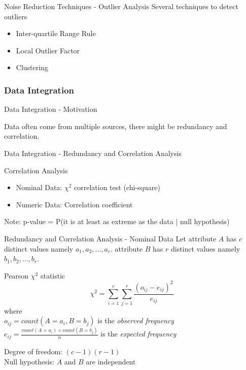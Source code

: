 \begin{frame}{Noise Reduction Techniques - Outlier Analysis}
    Several techniques to detect outliers
    \begin{itemize}
        \item Inter-quartile Range Rule
        \item Local Outlier Factor
        \item Clustering
    \end{itemize}
\end{frame}


\subsubsection{Data Integration}
\begin{frame}{Data Integration - Motivation}

Data often come from multiple sources, there might be redundancy and correlation.

\end{frame}

\begin{frame}{Data Integration - Redundancy and Correlation Analysis}

Correlation Analysis

\begin{itemize}
    \item Nominal Data: $\chi^2$ correlation test (chi-square)
    \item Numeric Data: Correlation coefficient
\end{itemize}

Note: p-value = P(it is at least as extreme as the data | null hypothesis)

\end{frame}

\begin{frame}{Redundancy and Correlation Analysis - Nominal Data}
Let attribute $A$ has $c$ distinct values namely $a_1, a_2, ..., a_c$. attribute $B$ has $r$ distinct values namely $b_1, b_2, ..., b_r$.
\begin{exampleblock}{Pearson $\chi^2$ statistic}
    \begin{equation}
        \chi^2 = \sum_{i=1}^c \sum_{j=1}^r \frac{(o_{ij} - e_{ij})^2}{e_{ij}}
    \end{equation}
    where \\
    $o_{ij}  = count(A=a_i, B=b_j)$ is  the \emph{observed frequency} \\
    $e_{ij} = \frac{count(A=a_i) \times count(B=b_j)}{n}$ is the \emph{expected frequency}
\end{exampleblock}

Degree of freedom: $(c-1)(r-1)$ \\
Null hypothesis: $A$ and $B$ are independent
\end{frame}

